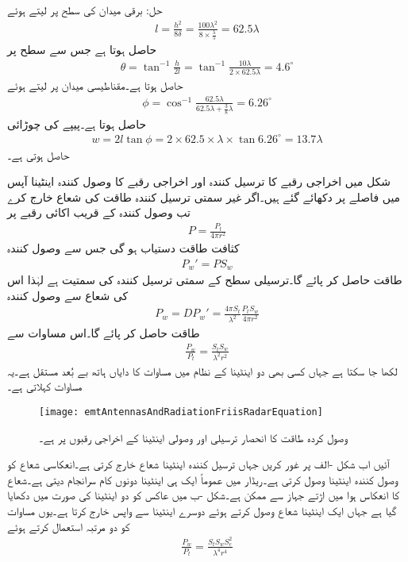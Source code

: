 حل:
برقی میدان کی سطح پر  لیتے ہوئے 
\begin{align*}
l=\frac{h^2}{8 \delta}=\frac{100 \lambda^2}{8 \times \frac{\lambda}{5}}=62.5 \lambda
\end{align*}
حاصل ہوتا ہے جس سے  سطح پر 
\begin{align*}
\theta=\tan^{-1}\frac{h}{2l}=\tan^{-1} \frac{10 \lambda}{2\times 62.5 \lambda}=4.6^{\circ}
\end{align*}
حاصل ہوتا ہے۔مقناطیسی میدان پر  لیتے ہوئے 
\begin{align*}
\phi=\cos^{-1} \frac{62.5\lambda}{62.5\lambda+\frac{3}{8}\lambda}=6.26^{\circ}
\end{align*}
حاصل ہوتا ہے۔پیپے کی چوڑائی
\begin{align*}
w=2 l \tan \phi=2 \times 62.5 \times \lambda \times \tan 6.26^{\circ}=13.7 \lambda
\end{align*}
حاصل ہوتی ہے۔

شکل  میں  اخراجی رقبے کا ترسیل کنندہ  اور  اخراجی رقبے کا وصول کنندہ اینٹینا آپس میں  فاصلے پر دکھائے گئے ہیں۔اگر غیر سمتی ترسیل کنندہ   طاقت کی شعاع خارج کرے تب وصول کنندہ کے قریب اکائی رقبے پر 
\begin{align}
P=\frac{P_t}{4\pi r^2}
\end{align}
کثافت طاقت دستیاب ہو گی جس سے وصول کنندہ
\begin{align}
P_w'=P S_w
\end{align}
طاقت حاصل کر پائے گا۔ترسیلی سطح  کے سمتی ترسیل کنندہ کی سمتیت  ہے لہٰذا اس کی شعاع سے وصول کنندہ
\begin{align}
P_w=D P_w'= \frac{4\pi S_t}{\lambda^2}\frac{P_t S_w}{4\pi r^2}
\end{align}
طاقت حاصل کر پائے گا۔اس مساوات سے
\begin{align}\label{مساوات_اینٹینا_ریڈار_الف}
\frac{P_w}{P_t}=\frac{S_t S_w}{\lambda^2 r^2}
\end{align}
لکھا جا سکتا ہے جہاں کسی بھی دو اینٹینا کے نظام میں مساوات کا دایاں ہاتھ بے بُعد مستقل ہے۔یہ مساوات  کہلاتی ہے۔
\begin{figure}
\centering
\texttt{[image: emtAntennasAndRadiationFriisRadarEquation]}
\caption{وصول کردہ طاقت کا انحصار ترسیلی اور وصولی اینٹینا کے اخراجی رقبوں پر ہے۔}
\label{شکل_اینٹینا_ریڈار_الف}
\end{figure}
آئیں اب شکل -الف پر غور کریں  جہاں ترسیل کنندہ اینٹینا شعاع خارج کرتی ہے۔انعکاسی شعاع کو وصول کنندہ اینٹینا وصول کرتی ہے۔ریڈار میں عموماً ایک ہی اینٹینا دونوں کام سرانجام دیتی ہے۔شعاع کا انعکاس ہوا میں اڑتے جہاز سے ممکن ہے۔شکل -ب میں عاکس کو دو اینٹینا کی صورت میں دکھایا گیا ہے جہاں ایک اینٹینا شعاع وصول کرتے ہوئے دوسرے اینٹینا سے واپس خارج کرتا ہے۔یوں مساوات  کو دو مرتبہ استعمال کرتے ہوئے
\begin{align}
\frac{P_w}{P_t}=\frac{S_t S_w S^2_e}{\lambda^4 r^4}
\end{align}

